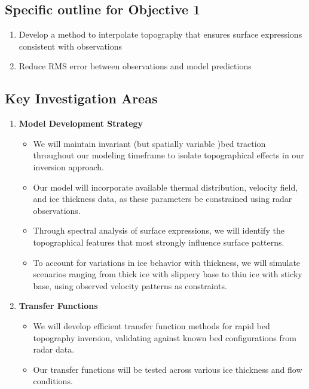 \subsection*{Specific outline for Objective 1}
\begin{enumerate}
\item Develop a method to interpolate topography that ensures surface expressions consistent with observations
\item Reduce RMS error between observations and model predictions
\end{enumerate}

\subsection*{Key Investigation Areas}
\begin{enumerate}
\item\textbf{Model Development Strategy}
    \begin{itemize}
    \item We will maintain invariant (but spatially variable )bed traction throughout our modeling timeframe to isolate topographical effects in our inversion approach.
    
    \item Our model will incorporate available thermal distribution, velocity field, and ice thickness data, as these parameters be constrained using radar observations.
    
    \item Through spectral analysis of surface expressions, we will identify the topographical features that most strongly influence surface patterns.
    
    \item To account for variations in ice behavior with thickness, we will simulate scenarios ranging from thick ice with slippery base to thin ice with sticky base, using observed velocity patterns as constraints.
    \end{itemize}

\item\textbf{Transfer Functions}
    \begin{itemize}
    \item We will develop efficient transfer function methods for rapid bed topography inversion, validating against known bed configurations from radar data.
    
    \item Our transfer functions will be tested across various ice thickness and flow conditions.
    

\end{itemize}
\end{enumerate}
